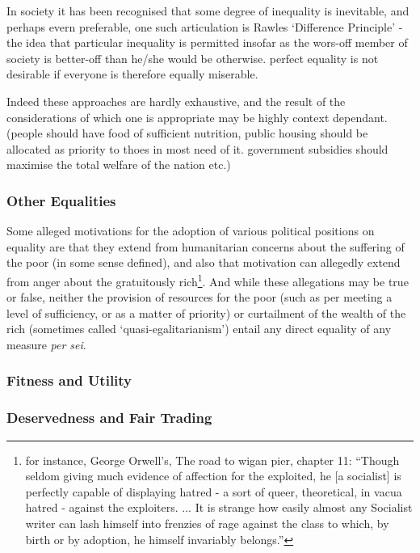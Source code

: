 In society it has been recognised that some degree of inequality is inevitable, and perhaps evern preferable, one such articulation is Rawles `Difference Principle' - the idea that particular inequality is permitted insofar as the wors-off member of society is better-off than he/she would be otherwise.
perfect equality is not desirable if everyone is therefore equally miserable.

Indeed these approaches are hardly exhaustive, and the result of the considerations of which one is appropriate may be highly context dependant. (people should have food of sufficient nutrition, public housing should be allocated as priority to thoes in most need of it. government subsidies should maximise the total welfare of the nation etc.) 



\subsubsection{Other Equalities}

Some alleged motivations for the adoption of various political positions on equality are that they extend from humanitarian concerns about the suffering of the poor (in some sense defined), and also that motivation can allegedly extend from anger about the gratuitously rich\footnote{for instance, George Orwell's, The road to wigan pier, chapter 11: ``Though seldom giving much evidence of affection for the exploited, he [a socialist] is perfectly capable of displaying hatred - a sort of queer, theoretical, in vacua hatred - against the exploiters. ... It is strange how easily almost any Socialist writer can lash himself into frenzies of rage against the class to which, by birth or by adoption, he himself invariably belongs.'' }.
And while these allegations may be true or false, neither the provision of resources for the poor (such as per meeting a level of sufficiency, or as a matter of priority) or curtailment of the wealth of the rich (sometimes called `quasi-egalitarianism') entail any direct equality of any measure \textit{per sei}.



\subsubsection{Fitness and Utility}


\subsubsection{Deservedness and Fair Trading}



